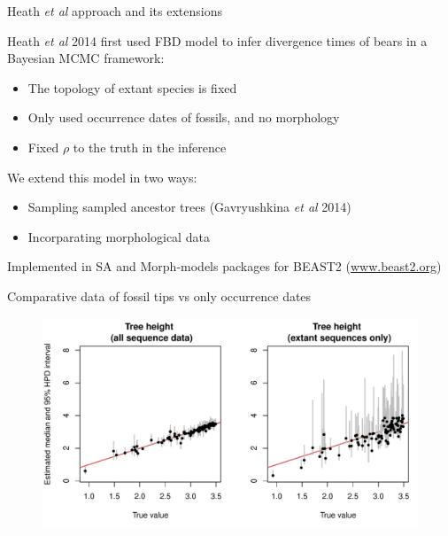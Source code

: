 \fi


\begin{frame}{Heath {\it et al} approach and its extensions}

 Heath {\it et al} 2014 first used FBD model to infer divergence times of bears in a Bayesian MCMC framework:  

\begin{itemize}
\item The topology of extant species is fixed
\item Only used occurrence dates of fossils, and no morphology 
\item Fixed $\rho$ to the truth in the inference
\end{itemize}

We extend this model in two ways:

\begin{itemize}
\item Sampling sampled ancestor trees (Gavryushkina {\it et al} 2014)
\item Incorparating morphological data
\end{itemize}

Implemented in SA and Morph-models packages for BEAST2 (\url{www.beast2.org})

\end{frame}




\begin{frame}{Comparative data of fossil tips vs only occurrence dates}

\begin{figure}
\includegraphics[width=\textwidth]{pics/Height_SA/Rplots.pdf}
\end{figure}

\end{frame}



